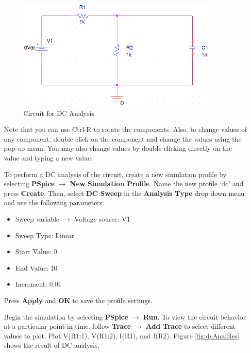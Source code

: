 \documentclass[12pt]{../manual}
\begin{document}
\begin{figure}[ht!]
	\begin{center}
		\includegraphics[width=0.9\textwidth]{figures/DCAnalysisCircuitCrop.PNG}
	\end{center}
	\caption{Circuit for DC Analysis}
	\label{fig:dc}
\end{figure}

Note that you can use Ctrl-R to rotate the components. Also, to change values of any component, double click on the component and change the values using the pop-up menu. You may also change values by double clicking directly on the value and typing a new value.

To perform a DC analysis of the circuit, create a new simulation profile by selecting \textbf{PSpice} $\to$ \textbf{New Simulation Profile}. Name the new profile `dc' and press \textbf{Create}. Then,  select \textbf{DC Sweep} in the \textbf{Analysis Type} drop down menu and use the following parameters:
\begin{itemize}
\item Sweep variable $\to$ Voltage source: V1
\item Sweep Type: Linear
\item Start Value: 0
\item End Value: 10
\item Increment: 0.01
\end{itemize}

Press \textbf{Apply} and \textbf{OK} to save the profile settings. 

Begin the simulation by selecting \textbf{PSpice} $\to$ \textbf{Run}. To view the circuit behavior at a particular point in time, follow \textbf{Trace} $\to$ \textbf{Add Trace} to select different values to plot. Plot V(R1:1), V(R1:2), I(R1), and I(R2). Figure \ref{fig:dcAnalRes} shows the result of DC analysis.
\end{document}
